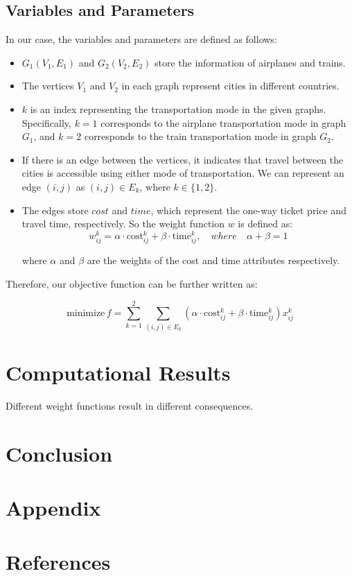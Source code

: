 \documentclass[11pt]{article}
\begin{document}
\subsection*{Variables and Parameters}
In our case, the variables and parameters are defined as follows:
\begin{itemize}
  \item $G_1(V_1, E_1)$ and $G_2(V_2, E_2)$ store the information of airplanes and trains.
  \item The vertices $V_1$ and $V_2$ in each graph represent cities in different countries.
  \item $k$ is an index representing the transportation mode in the given graphs. Specifically, $k = 1$ corresponds to the airplane transportation mode in graph $G_1$, and $k = 2$ corresponds to the train transportation mode in graph $G_2$.
  \item If there is an edge between the vertices, it indicates that travel between the cities is accessible using either mode of transportation. We can represent an edge $(i, j)$ as $(i, j) \in E_k$, where $k \in \{1, 2\}$.
  \item The edges store $cost$ and $time$, which represent the one-way ticket price and travel time, respectively. So the weight function $w$ is defined as:
\begin{equation*}
w_{ij}^k = \alpha \cdot \text{cost}_{ij}^k + \beta \cdot \text{time}_{ij}^k, \quad where \quad \alpha + \beta = 1
\end{equation*}

where $\alpha$ and $\beta$ are the weights of the cost and time attributes respectively. 

\end{itemize}
Therefore, our objective function can be further written as:

\begin{equation*}
\text{minimize}\, f = \sum_{k=1}^{2} \sum_{(i,j) \in E_k} (\alpha \cdot \text{cost}_{ij}^k + \beta \cdot \text{time}_{ij}^k) x_{ij}^k
\end{equation*}

\section{Computational Results}
Different weight functions result in different
consequences\cite{lamport1994latex}.
\section{Conclusion}
\section{Appendix}
\section{References}
\printbibliography[heading=none]
\end{document}
